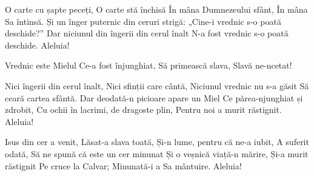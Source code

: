 \beginverse
O carte cu șapte peceți,
O carte stă închisă
În mâna Dumnezeului sfânt,
În mâna Sa întinsă.
Și un înger puternic din ceruri strigă:
„Cine-i vrednic s-o poată deschide?”
Dar niciunul din îngerii din cerul înalt
N-a fost vrednic s-o poată deschide.
Aleluia!
\endverse

\beginchorus
Vrednic este Mielul
Ce-a fost înjunghiat,
Să primească slava,
Slavă ne-ncetat!
\endchorus

\beginverse
Nici îngerii din cerul înalt,
Nici sfinții care cântă,
Niciunul vrednic nu s-a găsit
Să ceară cartea sfântă.
Dar deodată-n picioare apare un Miel
Ce părea-njunghiat și zdrobit,
Cu ochii în lacrimi, de dragoste plin,
Pentru noi a murit răstignit.
Aleluia!
\endverse

\beginverse
Isus din cer a venit,
Lăsat-a slava toată,
Și-n lume, pentru că ne-a iubit,
A suferit odată,
Să ne spună că este un cer minunat
Și o veșnică viață-n mărire,
Și-a murit răstignit
Pe cruce la Calvar;
Minunată-i a Sa mântuire.
Aleluia!
\endverse
\endsong